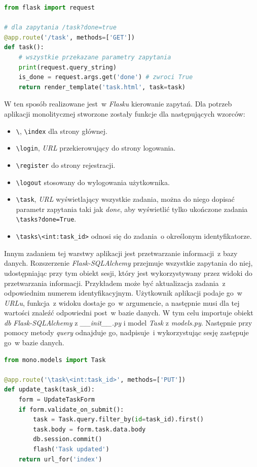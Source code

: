 \newpage
\begin{lstlisting}[language=Python, caption={Dostęp do parametrów zapytania w frameworku \textit{flask}.}]
from flask import request

# dla zapytania /task?done=true
@app.route('/task', methods=['GET'])
def task():
	# wszystkie przekazane parametry zapytania
	print(request.query_string) 
	is_done = request.args.get('done') # zwroci True
	return render_template('task.html', task=task)
\end{lstlisting}
W ten sposób realizowane jest~w \textit{Flasku} kierowanie zapytań. Dla potrzeb aplikacji monolitycznej stworzone zostały funkcje dla następujących wzorców:
\begin{itemize}
  \item \verb|\|, \verb|\index| dla strony głównej.
  \item \verb|\login|, \textit{URL} przekierowujący do strony logowania.
  \item \verb|\register| do strony rejestracji.
  \item \verb|\logout| stosowany do wylogowania użytkownika.
  \item \verb|\task|, \textit{URL} wyświetlający wszystkie zadania, można do niego dopisać parametr zapytania taki jak \textit{done}, aby wyświetlić tylko ukończone zadania \\ \verb|\tasks?done=True|.
  \item \verb|\tasks\<int:task_id>| odnosi się do zadania~o określonym identyfikatorze.
\end{itemize}
 
Innym zadaniem tej warstwy aplikacji jest przetwarzanie informacji~z bazy danych. Rozszerzenie \textit{Flask-SQLAlchemy} przejmuje wszystkie zapytania do niej, udostępniając przy tym obiekt sesji, który jest wykorzystywany przez widoki do przetwarzania informacji\cite{Ziade:2018}. Przykładem może być aktualizacja zadania~z odpowiednim numerem identyfikacyjnym. Użytkownik aplikacji podaje go~w \textit{URLu}, funkcja~z widoku dostaje go~w argumencie, a następnie musi dla tej wartości znaleźć odpowiedni post~w bazie danych. W tym celu importuje obiekt \textit{db} \textit{Flask-SQLAlchemy} z \textit{\_\_init\_\_.py} i model \textit{Task} z \textit{models.py}. Następnie przy pomocy metody \textit{query} odnajduje go, nadpisuje~i wykorzystując sesję zastępuje go~w bazie danych.
\begin{lstlisting}[language=Python, caption={Wykorzystanie sesji bazy danych w widoku do zaktualizowania zadania.}]
from mono.models import Task

@app.route('\task\<int:task_id>', methods=['PUT'])
def update_task(task_id):
	form = UpdateTaskForm
	if form.validate_on_submit():
		task = Task.query.filter_by(id=task_id).first()
		task.body = form.task.data.body
		db.session.commit()
		flash('Task updated')
	return url_for('index')
\end{lstlisting}

